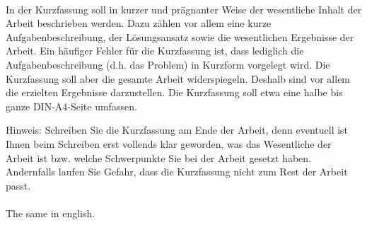 \kurzfassung

\paragraph*{}
In der Kurzfassung soll in kurzer und prägnanter Weise der wesentliche Inhalt der Arbeit beschrieben werden.
Dazu zählen vor allem eine kurze Aufgabenbeschreibung, der Lösungsansatz sowie die wesentlichen Ergebnisse der Arbeit.
Ein häufiger Fehler für die Kurzfassung ist, dass lediglich die Aufgabenbeschreibung (d.h. das Problem) in Kurzform vorgelegt wird. 
Die Kurzfassung soll aber die gesamte Arbeit widerspiegeln. Deshalb sind vor allem die erzielten Ergebnisse darzustellen. 
Die Kurzfassung soll etwa eine halbe bis ganze DIN-A4-Seite umfassen.

Hinweis: Schreiben Sie die Kurzfassung am Ende der Arbeit, denn eventuell ist Ihnen beim Schreiben erst vollends klar geworden, was das Wesentliche der Arbeit ist bzw. welche Schwerpunkte Sie bei der Arbeit gesetzt haben. Andernfalls laufen Sie Gefahr, dass die Kurzfassung nicht zum Rest der Arbeit passt.

\paragraph*{}
The same in english.
